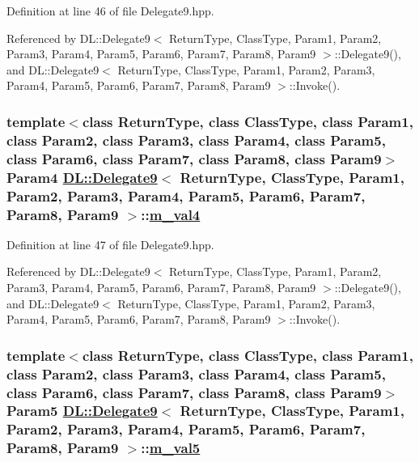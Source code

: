 Definition at line 46 of file Delegate9.hpp.

Referenced by DL::Delegate9$<$ Return\-Type, Class\-Type, Param1, Param2, Param3, Param4, Param5, Param6, Param7, Param8, Param9 $>$::Delegate9(), and DL::Delegate9$<$ Return\-Type, Class\-Type, Param1, Param2, Param3, Param4, Param5, Param6, Param7, Param8, Param9 $>$::Invoke().\hypertarget{classDL_1_1Delegate9_r5}{
\subsubsection[m\_\-val4]{\setlength{\rightskip}{0pt plus 5cm}template$<$class Return\-Type, class Class\-Type, class Param1, class Param2, class Param3, class Param4, class Param5, class Param6, class Param7, class Param8, class Param9$>$ Param4 \hyperlink{classDL_1_1Delegate9}{DL::Delegate9}$<$ Return\-Type, Class\-Type, Param1, Param2, Param3, Param4, Param5, Param6, Param7, Param8, Param9 $>$::\hyperlink{classDL_1_1Delegate9_r5}{m\_\-val4}}}
\label{classDL_1_1Delegate9_r5}




Definition at line 47 of file Delegate9.hpp.

Referenced by DL::Delegate9$<$ Return\-Type, Class\-Type, Param1, Param2, Param3, Param4, Param5, Param6, Param7, Param8, Param9 $>$::Delegate9(), and DL::Delegate9$<$ Return\-Type, Class\-Type, Param1, Param2, Param3, Param4, Param5, Param6, Param7, Param8, Param9 $>$::Invoke().\hypertarget{classDL_1_1Delegate9_r6}{
\subsubsection[m\_\-val5]{\setlength{\rightskip}{0pt plus 5cm}template$<$class Return\-Type, class Class\-Type, class Param1, class Param2, class Param3, class Param4, class Param5, class Param6, class Param7, class Param8, class Param9$>$ Param5 \hyperlink{classDL_1_1Delegate9}{DL::Delegate9}$<$ Return\-Type, Class\-Type, Param1, Param2, Param3, Param4, Param5, Param6, Param7, Param8, Param9 $>$::\hyperlink{classDL_1_1Delegate9_r6}{m\_\-val5}}}
\label{classDL_1_1Delegate9_r6}




